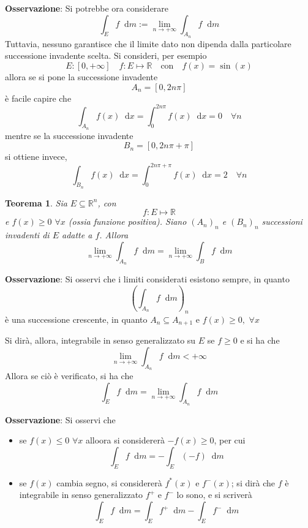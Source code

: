 \documentclass[a4paper]{extarticle}
\newtheorem{theorem}{Teorema}[section]
\newcommand*\dif{\mathop{}\!\mathrm{d}}
\begin{document}
\vspace{2em}
\noindent
\textbf{Osservazione}: Si potrebbe ora considerare
\[\int_E f \dif m := \lim_{n \to +\infty} \int_{A_n} f \dif m\]
Tuttavia, nessuno garantisce che il limite dato non dipenda dalla particolare successione invadente scelta. Si consideri, per esempio
\[E : [0,+\infty] \hspace{1em} f : E \longmapsto \mathbb{R} \hspace{1em} \text{con} \hspace{1em} f(x)=\sin(x)\]
allora se si pone la successione invadente
\[A_n = [0,2n\pi]\]
è facile capire che
\[\int_{A_n} f(x) \dif x = \int_0^{2n\pi} f(x) \dif x = 0 \hspace{1em} \forall n\]
mentre se la successione invadente
\[B_n = [0,2n\pi + \pi]\]
si ottiene invece,
\[\int_{B_n} f(x) \dif x = \int_0^{2n\pi + \pi} f(x) \dif x = 2 \hspace{1em} \forall n\]

\vspace{1em}
\begin{theorem}
    Sia $E \subseteq \mathbb{R}^n$, con
    \[f : E \longmapsto \mathbb{R}\]
    e $f(x) \geq 0$ $\forall x$ (ossia funzione positiva). Siano $(A_n)_n$ e $(B_n)_n$ successioni invadenti di $E$ adatte a $f$. Allora
    \[\lim_{n \to +\infty} \int_{A_n} f \dif m = \lim_{n \to +\infty} \int_B f \dif m\]
\end{theorem}

\vspace{2em}
\noindent
\textbf{Osservazione}: Si osservi che i limiti considerati esistono sempre, in quanto
\[\left(\int_{A_n} f \dif m\right)_{n}\]
è una successione crescente, in quanto $A_n \subseteq A_{n+1}$ e $f(x) \geq 0,$ $\forall x$

\vspace{2em}
\noindent
Si dirà, allora, integrabile in senso generalizzato su $E$ se  $f \geq 0$ e si ha che
\[\lim_{n \to +\infty} \int_{A_n} f \dif m < + \infty\]
Allora se ciò è verificato, si ha che
\[\int_E f \dif m = \lim_{n \to +\infty} \int_{A_n} f \dif m\]

\vspace{2em}
\noindent
\textbf{Osservazione}: Si osservi che
\begin{itemize}
    \item se $f(x) \leq 0$ $\forall x$ alloora si considererà $-f(x) \geq 0$, per cui
    \[\int_E f \dif m = - \int_E (-f) \dif m\]
    \item se $f(x)$ cambia segno, si considererà $f^*(x)$ e $f^-(x)$; si dirà che $f$ è integrabile in senso generalizzato $f^+$ e $f^-$ lo sono, e si scriverà
    \[\int_E f \dif m = \int_E f^+ \dif m - \int_E f^- \dif m\]
\end{itemize}
\end{document}
